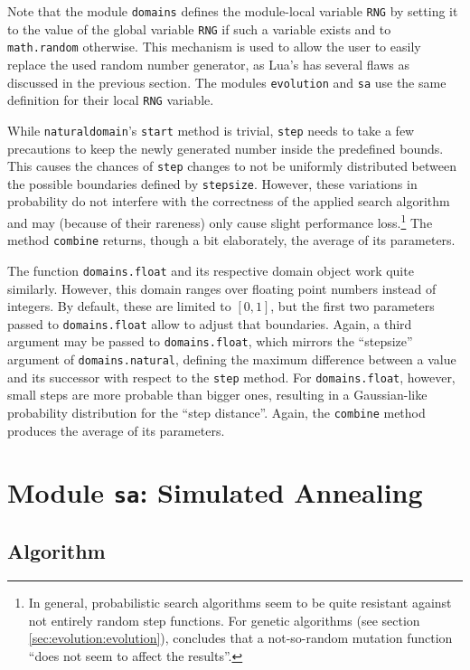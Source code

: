 Note that the module \texttt{domains} defines the module-local variable \texttt{RNG} by setting it to the value of the global variable \texttt{RNG} if such a variable exists and to \texttt{math.random} otherwise. This mechanism is used to allow the user to easily replace the used random number generator, as Lua's has several flaws as discussed in the previous section. The modules \texttt{evolution} and \texttt{sa} use the same definition for their local \texttt{RNG} variable.

While \texttt{naturaldomain}'s \texttt{start} method is trivial, \texttt{step} needs to take a few precautions to keep the newly generated number inside the predefined bounds. This causes the chances of \texttt{step} changes to not be uniformly distributed between the possible boundaries defined by \texttt{stepsize}. However, these variations in probability do not interfere with the correctness of the applied search algorithm and may (because of their rareness) only cause slight performance loss.\footnote{In general, probabilistic search algorithms seem to be quite resistant against not entirely random step functions. For genetic algorithms (see section \ref{sec:evolution:evolution}), \cite{CantuPaz2002} concludes that a not-so-random mutation function ``does not seem to affect the results''.} The method \texttt{combine} returns, though a bit elaborately, the average of its parameters.

The function \texttt{domains.float} and its respective domain object work quite similarly. However, this domain ranges over floating point numbers instead of integers. By default, these are limited to $[0, 1]$, but the first two parameters passed to \texttt{domains.float} allow to adjust that boundaries. Again, a third argument may be passed to \texttt{domains.float}, which mirrors the ``stepsize'' argument of \texttt{domains.natural}, defining the maximum difference between a value and its successor with respect to the \texttt{step} method. For \texttt{domains.float}, however, small steps are more probable than bigger ones, resulting in a Gaussian-like probability distribution for the ``step distance''. Again, the \texttt{combine} method produces the average of its parameters.

\section{Module \texttt{sa}: Simulated Annealing}
\label{sec:evolution:sa}

\subsection{Algorithm}

